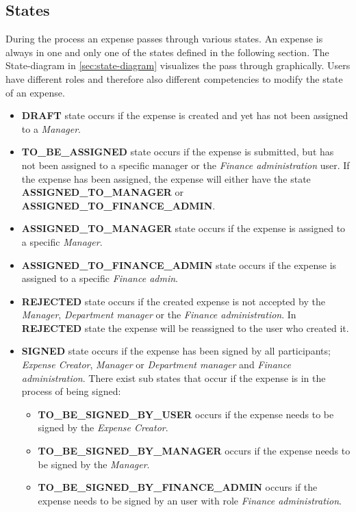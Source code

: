 \subsection{States}
\label{sec:states}
During the process an expense passes through various states. An expense is always in one and only one of the states defined in the following section. The State-diagram in \ref{sec:state-diagram} visualizes the pass through graphically. Users have different roles and therefore also different competencies to modify the state of an expense.

\begin{itemize}
	\item \textbf{DRAFT} state occurs if the expense is created and yet has not been assigned to a \textit{Manager}.
	
	\item \textbf{TO\_BE\_ASSIGNED} state occurs if the expense is submitted, but has not been assigned to a specific manager or the \textit{Finance administration} user. If the expense has been assigned, the expense will either have the state \newline \textbf{ASSIGNED\_TO\_MANAGER} or \newline \textbf{ASSIGNED\_TO\_FINANCE\_ADMIN}.
	
	\item \textbf{ASSIGNED\_TO\_MANAGER} state occurs if the expense is assigned to a specific \textit{Manager}.
	
	\item \textbf{ASSIGNED\_TO\_FINANCE\_ADMIN} state occurs if the expense is assigned to a specific \textit{Finance admin}.
	
	\item \textbf{REJECTED} state occurs if the created expense is not accepted by the \textit{Manager}, \textit{Department manager} or the \textit{Finance administration}. In \textbf{REJECTED} state the expense will be reassigned to the user who created it.
	
	\item \textbf{SIGNED} state occurs if the expense has been signed by all participants; \textit{Expense Creator}, \textit{Manager} or \textit{Department manager} and \textit{Finance administration}. There exist sub states that occur if the expense is in the process of being signed:
	\begin{itemize}
		\item \textbf{TO\_BE\_SIGNED\_BY\_USER} occurs if the expense needs to be signed by the \textit{Expense Creator}.
		\item \textbf{TO\_BE\_SIGNED\_BY\_MANAGER} occurs if the expense needs to be \newline signed by the \textit{Manager}.
		\item \textbf{TO\_BE\_SIGNED\_BY\_FINANCE\_ADMIN} occurs if the expense \newline needs to be signed by an user with role \textit{Finance administration}.
	\end{itemize}
	

\end{itemize}
